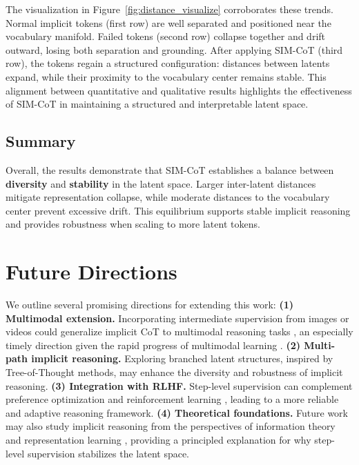 The visualization in Figure~\ref{fig:distance_visualize} corroborates these trends. Normal implicit tokens (first row) are well separated and positioned near the vocabulary manifold. Failed tokens (second row) collapse together and drift outward, losing both separation and grounding. After applying SIM-CoT (third row), the tokens regain a structured configuration: distances between latents expand, while their proximity to the vocabulary center remains stable. This alignment between quantitative and qualitative results highlights the effectiveness of SIM-CoT in maintaining a structured and interpretable latent space.

\subsection{Summary}
Overall, the results demonstrate that SIM-CoT establishes a balance between \textbf{diversity} and \textbf{stability} in the latent space. Larger inter-latent distances mitigate representation collapse, while moderate distances to the vocabulary center prevent excessive drift. This equilibrium supports stable implicit reasoning and provides robustness when scaling to more latent tokens.

\section{Future Directions}

We outline several promising directions for extending this work:  
\textbf{(1) Multimodal extension.} Incorporating intermediate supervision from images \citep{chen2023sharegpt4v, sun2024alpha, liu2024mmdu} or videos \citep{chen2024sharegpt4video, wei2025videorope} could generalize implicit CoT to multimodal reasoning tasks \citep{shen2025efficient, zhang2025booststep}, an especially timely direction given the rapid progress of multimodal learning \citep{liu2023llava, chen2023sharegpt4v, zhang2025sec, liu2025songgen, wei2025videoropepp, zhang2024internlm, dong2024internlm, zhao2025omnialign, ding2025mmifenginemultimodalinstructionfollowing, chen2024open, xing2025scalecap, xing2024pyramiddrop}. 
\textbf{(2) Multi-path implicit reasoning.} Exploring branched latent structures, inspired by Tree-of-Thought \citep{yao2023tree, wang2023selfconsistency, zhang2023evaluating} methods, may enhance the diversity and robustness of implicit reasoning.  
\textbf{(3) Integration with RLHF.} Step-level supervision can complement preference optimization and reinforcement learning \citep{guo2025deepseek, rafailov2023direct, liu2025visual, internlmxcomposer2_5_reward}, leading to a more reliable and adaptive reasoning framework.  
\textbf{(4) Theoretical foundations.} Future work may also study implicit reasoning from the perspectives of information theory and representation learning \citep{zhu2025reasoning, xu2025cot}, providing a principled explanation for why step-level supervision stabilizes the latent space.




